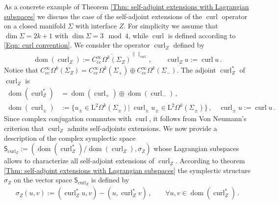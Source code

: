 \begin{Example}
	As a concrete example of Theorem \ref{Thm: self-adjoint extensions with Lagrangian subspaces} we discuss the case of the self-adjoint extensions of the $\operatorname{curl}$ operator on a closed manifold $\Sigma$ with interface $Z$.
	For simplicity we assume that $\dim\Sigma=2k+1$ with $\dim\Sigma=3\mod 4$, while $\operatorname{curl}$ is defined according to \eqref{Eqn: curl convention}.
	We consider the operator $\operatorname{curl}_Z$ defined by
	\begin{align}\label{Eqn: Z-curl operator}
		\operatorname{dom}(\operatorname{curl}_Z):=\overline{C^\infty_{\mathrm{cc}}\Omega^k(\Sigma_Z)}^{\|\|_{\operatorname{curl}}}\,,\qquad
		\operatorname{curl}_Zu:=\operatorname{curl}u\,.
	\end{align}
	Notice that $C^\infty_{\mathrm{cc}}\Omega^k(\Sigma_Z)=C^\infty_{\mathrm{cc}}\Omega^k(\Sigma_+)\oplus C^\infty_{\mathrm{cc}}\Omega^k(\Sigma_-)$.
	The adjoint $\operatorname{curl}_Z^*$ of $\operatorname{curl}_Z$ is
	\begin{align}\label{Eqn: adjoint of Z-curl operator}
		\operatorname{dom}(\operatorname{curl}_Z^*)&=
		\operatorname{dom}(\operatorname{curl}_+)\oplus\operatorname{dom}(\operatorname{curl}_-)\,,\\
		\operatorname{dom}(\operatorname{curl}_\pm)&:=\lbrace
		u_\pm\in\mathrm{L}^2\Omega^k(\Sigma_\pm)|\;\operatorname{curl}_\pm u_\pm\in\mathrm{L}^2\Omega^k(\Sigma_\pm)\rbrace\,,\quad
		\operatorname{curl}_\pm u:=\operatorname{curl}u\,.
	\end{align}
	Since complex conjugation commutes with $\operatorname{curl}$, it follows from Von Neumann's criterion \cite[Thm. 5.43]{Moretti-18} that $\operatorname{curl}_Z$ admits self-adjoints extensions.
	We now provide a description of the complex symplectic space $\mathsf{S}_{\operatorname{curl}_Z}:=(\operatorname{dom}(\operatorname{curl}_Z^*)/\operatorname{dom}(\operatorname{curl}_Z),\sigma_Z)$ whose Lagrangian subspaces allows to characterize all self-adjoint extensions of $\operatorname{curl}_Z$.
	According to theorem \ref{Thm: self-adjoint extensions with Lagrangian subspaces} the symplectic structure $\sigma_Z$ on the vector space $\mathsf{S}_{\operatorname{curl}_Z}$ is defined by
	\begin{align}\label{Eqn: presymplectic structure over the adjoint of Z-curl operator}
		\sigma_Z(u,v):=
		(\operatorname{curl}_Z^*u,v)-(u,\operatorname{curl}_Z^*v)\,,\qquad
		\forall u,v\in\operatorname{dom}(\operatorname{curl}_Z^*)\,.
	\end{align}

\end{Example}
